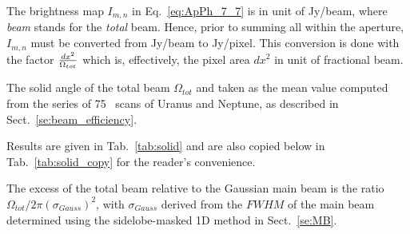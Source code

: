 
The brightness map $I_{m,n}$ in Eq.~\ref{eq:ApPh_7_7} is in unit of
Jy/beam, where {\it beam} stands for the {\it total} beam.
Hence, prior to summing all  within the aperture, $I_{m,n}$
must be converted from  Jy/beam to Jy/pixel. This
conversion is done with the factor $dx^2 \over {\Omega_{tot}}$
which is, effectively, the pixel area $dx^2$ in unit of fractional
beam. 

The solid angle of the total beam $\Omega_{tot}$  and taken as the mean value computed from the series of 75
\bm\ scans of Uranus and Neptune, as described in Sect.~\ref{se:beam_efficiency}.

Results are given in Tab.~\ref{tab:solid} and are also
copied below in Tab.~\ref{tab:solid_copy} for the reader's convenience. 

The excess of the total beam relative to the Gaussian main beam is the ratio
$\Omega_{tot} / 2 \pi (\sigma_{Gauss})^2$, with $\sigma_{Gauss}$
derived from the $FWHM$ of the main beam determined using the
sidelobe-masked 1D method in Sect.~\ref{se:MB}.


